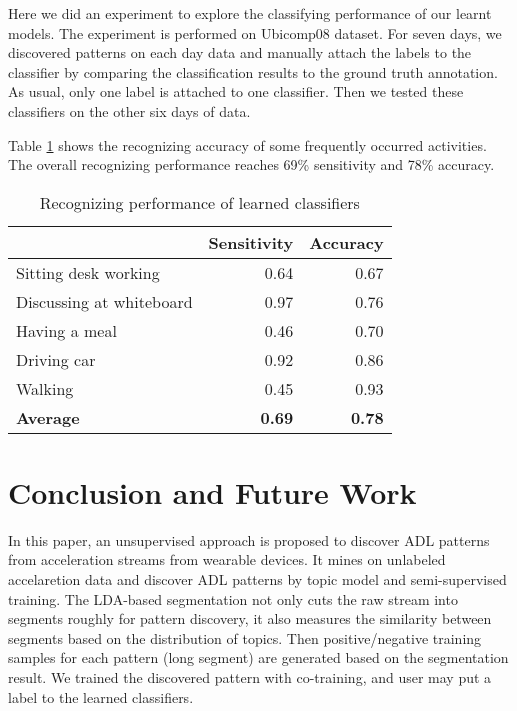 \documentclass{sigchi}
\begin{document}
    Here we did an experiment to explore the classifying performance of our learnt models.
    The experiment is performed on Ubicomp08 dataset. For seven days, we discovered patterns on each day data and manually attach the labels to the classifier by comparing the classification results to the ground truth annotation. As usual, only one label is attached to one classifier. Then we tested these classifiers on the other six days of data.
    
    Table \ref{tab:model-accuracy} shows the recognizing accuracy of some frequently occurred activities.
    The overall recognizing performance reaches 69\% sensitivity and 78\% accuracy.

    \begin{table}[htbp]

    \begin{tabular}{rrr}
    \toprule
          & \textbf{Sensitivity} & \textbf{Accuracy} \\
    \midrule
    \multicolumn{1}{l}{Sitting desk working} & 0.64  & 0.67  \\
    \multicolumn{1}{l}{Discussing at whiteboard} & 0.97  & 0.76  \\
    \multicolumn{1}{l}{Having a meal} & 0.46  & 0.70  \\
    \multicolumn{1}{l}{Driving car} & 0.92  & 0.86  \\
    \multicolumn{1}{l}{Walking} & 0.45  & 0.93  \\
    \multicolumn{1}{l}{\textbf{Average}} & \textbf{0.69}  & \textbf{0.78}  \\
    \bottomrule
    \end{tabular}%
 
  \caption{Recognizing performance of learned classifiers}
   \label{tab:model-accuracy}%
\end{table}%

\section{Conclusion and Future Work}
\label{sec.conclusion}

    In this paper, an unsupervised approach is proposed to discover ADL patterns from acceleration streams from wearable devices.
    It mines on unlabeled accelaretion data and discover ADL patterns by topic model and semi-supervised training. 
    The LDA-based segmentation not only cuts the raw stream into segments roughly for pattern discovery, it also measures the similarity between segments based on the distribution of topics.
    Then positive/negative training samples for each pattern (long segment) are generated based on the segmentation result. We trained the discovered pattern with co-training, and user may put a label to the learned classifiers.
    
\end{document}
